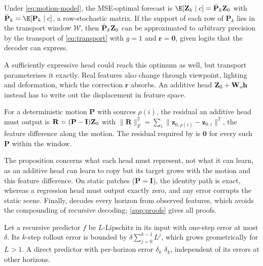 \begin{proposition}\label{prop:bayes}
Under \cref{eq:motion-model}, the MSE-optimal forecast is
$\E[\Z_k\mid c]=\bar{\mathbf{P}}_k\Z_0$ with $\bar{\mathbf{P}}_k=\E[\mathbf{P}_k\mid c]$, a row-stochastic matrix.
If the support of each row of $\mathbf{P}_k$ lies in the transport window $\mathcal{W}$, then $\bar{\mathbf{P}}_k\mathbf{Z}_0$
can be approximated to arbitrary precision by the transport of \cref{eq:transport} with $g{=}1$ and
$\mathbf{r}{=}\mathbf{0}$, given logits that the decoder can express.
\end{proposition}

A sufficiently expressive head could reach this optimum as well, but transport parameterises it exactly.
%
Real features also change through viewpoint, lighting and deformation, which the correction $\mathbf{r}$ absorbs.
%
An additive head $\mathbf{Z}_0+\mathbf{W}_o\mathbf{h}$ instead has to write out the displacement in feature space.

\begin{proposition}\label{prop:residual}
For a deterministic motion $\mathbf{P}$ with sources $\rho(i)$, the residual an additive head must output is
$\mathbf{R}=(\mathbf{P}-\mathbf{I})\mathbf{Z}_0$ with
$\|\mathbf{R}\|_F^2=\sum_i\|\mathbf{z}_{0,\rho(i)}-\mathbf{z}_{0,i}\|^2$, the feature difference along the motion. The
residual required by \ours{} is $\mathbf{0}$ for every such $\mathbf{P}$ within the window.
\end{proposition}

The proposition concerns what each head must represent, not what it can learn, as an additive head can learn to copy
but its target grows with the motion and this feature difference.
%
On static patches ($\mathbf{P}=\mathbf{I}$), the identity path is exact, whereas a regression head must output exactly
zero, and any error corrupts the static scene.
%
Finally, \ours{} decodes every horizon from observed features, which avoids the compounding of recursive decoding;
\cref{app:proofs} gives all proofs.

\begin{proposition}\label{prop:compound}
Let a recursive predictor $f$ be $L$-Lipschitz in its input with one-step error at most $\delta$. Its $k$-step
rollout error is bounded by $\delta\sum_{j=0}^{k-1}L^j$, which grows geometrically for $L>1$. A direct predictor with
per-horizon error $\delta_k$  $\delta_k$, independent of its errors at other horizons.
\end{proposition}

